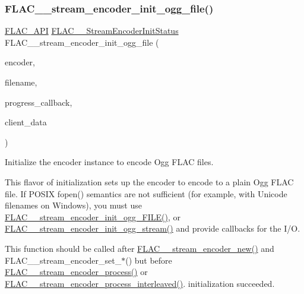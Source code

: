 \subsubsection{\texorpdfstring{FLAC\_\_stream\_encoder\_init\_ogg\_file()}{FLAC\_\_stream\_encoder\_init\_ogg\_file()}}
{\footnotesize\ttfamily \mbox{\hyperlink{group__flac__export_ga56ca07df8a23310707732b1c0007d6f5}{F\+L\+A\+C\+\_\+\+A\+PI}} \mbox{\hyperlink{group__flac__stream__encoder_ga3bb869620af2b188d77982a5c30b047d}{F\+L\+A\+C\+\_\+\+\_\+\+Stream\+Encoder\+Init\+Status}} F\+L\+A\+C\+\_\+\+\_\+stream\+\_\+encoder\+\_\+init\+\_\+ogg\+\_\+file (\begin{DoxyParamCaption}\item[{\mbox{\hyperlink{struct_f_l_a_c_____stream_encoder}{F\+L\+A\+C\+\_\+\+\_\+\+Stream\+Encoder}} $\ast$}]{encoder,  }\item[{const char $\ast$}]{filename,  }\item[{\mbox{\hyperlink{group__flac__stream__encoder_ga6e051c0e5837433f9e7cd56cd42ca6ba}{F\+L\+A\+C\+\_\+\+\_\+\+Stream\+Encoder\+Progress\+Callback}}}]{progress\+\_\+callback,  }\item[{\mbox{\hyperlink{_s_d_l__opengles2__gl2ext_8h_ae5d8fa23ad07c48bb609509eae494c95}{void}} $\ast$}]{client\+\_\+data }\end{DoxyParamCaption})}

Initialize the encoder instance to encode Ogg F\+L\+AC files.

This flavor of initialization sets up the encoder to encode to a plain Ogg F\+L\+AC file. If P\+O\+S\+IX fopen() semantics are not sufficient (for example, with Unicode filenames on Windows), you must use \mbox{\hyperlink{group__flac__stream__encoder_gab44c7f51a61826e04abd8cdf5c1ceac2}{F\+L\+A\+C\+\_\+\+\_\+stream\+\_\+encoder\+\_\+init\+\_\+ogg\+\_\+\+F\+I\+L\+E()}}, or \mbox{\hyperlink{group__flac__stream__encoder_ga87af71d74c09f7d482f9f420ef9bf826}{F\+L\+A\+C\+\_\+\+\_\+stream\+\_\+encoder\+\_\+init\+\_\+ogg\+\_\+stream()}} and provide callbacks for the I/O.

This function should be called after \mbox{\hyperlink{group__flac__stream__encoder_ga35f3d94452bcf0a90a31c7d770b200bc}{F\+L\+A\+C\+\_\+\+\_\+stream\+\_\+encoder\+\_\+new()}} and F\+L\+A\+C\+\_\+\+\_\+stream\+\_\+encoder\+\_\+set\+\_\+$\ast$() but before \mbox{\hyperlink{group__flac__stream__encoder_gae187ec4f6cab3ca109637996ee23272d}{F\+L\+A\+C\+\_\+\+\_\+stream\+\_\+encoder\+\_\+process()}} or \mbox{\hyperlink{group__flac__stream__encoder_ga67c2ff5b23b945180797de420b1f27c0}{F\+L\+A\+C\+\_\+\+\_\+stream\+\_\+encoder\+\_\+process\+\_\+interleaved()}}. initialization succeeded.



